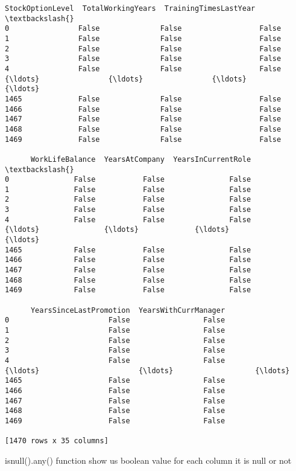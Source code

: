 \documentclass[11pt]{article}
\begin{document}
\begin{tcolorbox}[breakable, size=fbox, boxrule=.5pt, pad at break*=1mm, opacityfill=0]
\begin{Verbatim}[commandchars=\\\{\}]
      StockOptionLevel  TotalWorkingYears  TrainingTimesLastYear  \textbackslash{}
0                False              False                  False
1                False              False                  False
2                False              False                  False
3                False              False                  False
4                False              False                  False
{\ldots}                {\ldots}                {\ldots}                    {\ldots}
1465             False              False                  False
1466             False              False                  False
1467             False              False                  False
1468             False              False                  False
1469             False              False                  False

      WorkLifeBalance  YearsAtCompany  YearsInCurrentRole  \textbackslash{}
0               False           False               False
1               False           False               False
2               False           False               False
3               False           False               False
4               False           False               False
{\ldots}               {\ldots}             {\ldots}                 {\ldots}
1465            False           False               False
1466            False           False               False
1467            False           False               False
1468            False           False               False
1469            False           False               False

      YearsSinceLastPromotion  YearsWithCurrManager
0                       False                 False
1                       False                 False
2                       False                 False
3                       False                 False
4                       False                 False
{\ldots}                       {\ldots}                   {\ldots}
1465                    False                 False
1466                    False                 False
1467                    False                 False
1468                    False                 False
1469                    False                 False

[1470 rows x 35 columns]
\end{Verbatim}
\end{tcolorbox}
        
    isnull().any() function show us boolean value for each column it is null
or not
\end{document}
